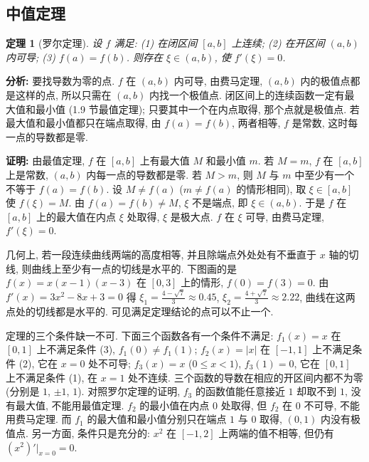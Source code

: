 \documentclass[UTF8,openany]{ctexbook}
\theoremstyle{chinesetextbook}
\newtheorem{theorem}{定理}[section]
\newenvironment{cnproof}{\par\indent\textbf{证明:} \ignorespaces}{\par}
\begin{document}
\subsection{中值定理}
\begin{theorem}[罗尔定理]\label{thm:c2-6-rolle}
设 $f$ 满足: (1) 在闭区间 $[a,b]$ 上连续; (2) 在开区间 $(a,b)$ 内可导; (3) $f(a)=f(b)$. 则存在 $\xi\in(a,b)$, 使 $f'(\xi)=0$.
\end{theorem}
\par\indent\textbf{分析:} 要找导数为零的点. $f$ 在 $(a,b)$ 内可导, 由费马定理, $(a,b)$ 内的极值点都是这样的点, 所以只需在 $(a,b)$ 内找一个极值点. 闭区间上的连续函数一定有最大值和最小值 (1.9 节最值定理); 只要其中一个在内点取得, 那个点就是极值点. 若最大值和最小值都只在端点取得, 由 $f(a)=f(b)$, 两者相等, $f$ 是常数, 这时每一点的导数都是零.
\begin{cnproof}
由最值定理, $f$ 在 $[a,b]$ 上有最大值 $M$ 和最小值 $m$. 若 $M=m$, $f$ 在 $[a,b]$ 上是常数, $(a,b)$ 内每一点的导数都是零. 若 $M>m$, 则 $M$ 与 $m$ 中至少有一个不等于 $f(a)=f(b)$. 设 $M\ne f(a)$ ($m\ne f(a)$ 的情形相同), 取 $\xi\in[a,b]$ 使 $f(\xi)=M$. 由 $f(a)=f(b)\ne M$, $\xi$ 不是端点, 即 $\xi\in(a,b)$. 于是 $f$ 在 $[a,b]$ 上的最大值在内点 $\xi$ 处取得, $\xi$ 是极大点. $f$ 在 $\xi$ 可导, 由费马定理, $f'(\xi)=0$.
\end{cnproof}
几何上, 若一段连续曲线两端的高度相等, 并且除端点外处处有不垂直于 $x$ 轴的切线, 则曲线上至少有一点的切线是水平的. 下图画的是 $f(x)=x(x-1)(x-3)$ 在 $[0,3]$ 上的情形, $f(0)=f(3)=0$. 由 $f'(x)=3x^2-8x+3=0$ 得 $\displaystyle\xi_1=\frac{4-\sqrt7}3\approx0.45$, $\displaystyle\xi_2=\frac{4+\sqrt7}3\approx2.22$, 曲线在这两点处的切线都是水平的. 可见满足定理结论的点可以不止一个.
\begin{center}
\end{center}
定理的三个条件缺一不可. 下面三个函数各有一个条件不满足: $f_1(x)=x$ 在 $[0,1]$ 上不满足条件 (3), $f_1(0)\ne f_1(1)$; $f_2(x)=|x|$ 在 $[-1,1]$ 上不满足条件 (2), 它在 $x=0$ 处不可导; $f_3(x)=x$ ($0\le x<1$), $f_3(1)=0$, 它在 $[0,1]$ 上不满足条件 (1), 在 $x=1$ 处不连续. 三个函数的导数在相应的开区间内都不为零 (分别是 $1$, $\pm1$, $1$). 对照罗尔定理的证明, $f_3$ 的函数值能任意接近 $1$ 却取不到 $1$, 没有最大值, 不能用最值定理. $f_2$ 的最小值在内点 $0$ 处取得, 但 $f_2$ 在 $0$ 不可导, 不能用费马定理. 而 $f_1$ 的最大值和最小值分别只在端点 $1$ 与 $0$ 取得, $(0,1)$ 内没有极值点. 另一方面, 条件只是充分的: $x^2$ 在 $[-1,2]$ 上两端的值不相等, 但仍有 $(x^2)'\big|_{x=0}=0$.
\end{document}
